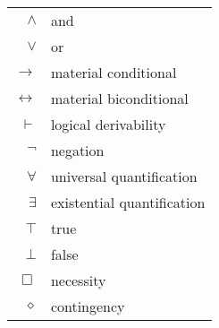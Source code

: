 % 


\ListofSymbols
\ 
\begin{center}
\begin{tabular}{rl}
  $\wedge$ & and \\
  $\vee$ & or \\
  $\rightarrow$ & material conditional \\
  $\leftrightarrow$ & material biconditional \\
  $\vdash$ & logical derivability \\
  $\neg$ & negation\\
  $\forall$ & universal quantification\\
  $\exists$ & existential quantification\\
  $\top$ & true\\
  $\bot$ & false\\
  $\Box$ & necessity\\
  $\diamond$ & contingency\\
\end{tabular}
\end{center}



\endinput 